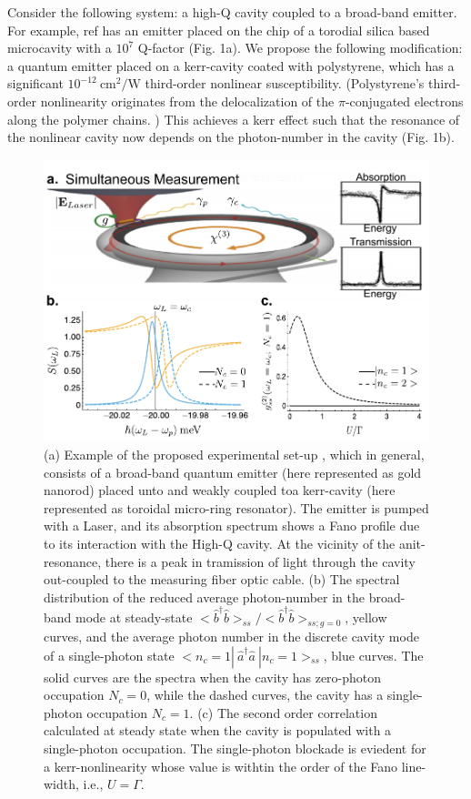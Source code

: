 \documentclass[12pt]{article}
\begin{document}
Consider the following system: a high-Q cavity coupled to a broad-band emitter.
For example, ref \cite{pan2019elucidating} has an emitter placed on the chip of 
a torodial silica based microcavity with a $10^{7}$ Q-factor (Fig. 1a). 
We propose the following modification: a quantum emitter placed on a 
kerr-cavity coated with polystyrene, which has a significant 
$10^{- 12} \:\mathrm{cm}^2/\mathrm{W}$ third-order nonlinear susceptibility.
\cite{qin2010design, liu200910} (Polystyrene's third-order nonlinearity 
originates from the delocalization of the $\pi$-conjugated electrons along the 
polymer chains. \cite{krausz1989optical, wong1991studies}) This achieves a kerr 
effect such that the resonance of the nonlinear cavity now depends on the 
photon-number in the cavity (Fig. 1b).

\begin{figure}[]
  \centering
  \includegraphics[width=1\linewidth]{fig.pdf}
  \caption{(a) Example of the proposed experimental set-up
  \cite{pan2019elucidating}, which in general, consists of a broad-band
  quantum emitter (here represented as gold nanorod) placed unto\textemdash
  and weakly coupled to\textemdash a kerr-cavity (here represented as
  toroidal micro-ring resonator). The emitter is pumped with a
  Laser, and its absorption spectrum shows a Fano profile due
  to its interaction with the High-Q cavity. At the vicinity of the
  anit-resonance, there is a peak in tramission of light through the cavity
  out-coupled to the measuring fiber optic cable. (b) The spectral distribution
  of the reduced average photon-number in the broad-band mode at steady-state
  $<\hat{b}^{\dagger}\hat{b}>_{ss}/<\hat{b}^{\dagger}\hat{b}>_{ss; g=0}$,
  yellow curves, and the average photon number in the discrete cavity mode of a
  single-photon state $<n_c=1|\: \hat{a}^{\dagger}\hat{a} \: |n_c=1>_{ss}$, 
  blue curves. The solid curves are the spectra when the cavity has zero-photon
  occupation $N_c=0$, while the dashed curves, the cavity has a single-photon
  occupation $N_c=1$. (c) The second order correlation calculated at steady
  state when the cavity is populated with a single-photon occupation.
  The single-photon blockade is eviedent for a kerr-nonlinearity whose value is
  withtin the order of the Fano line-width, i.e., $U=\Gamma$.
  }
  \label{fig}
\end{figure}
\end{document}
